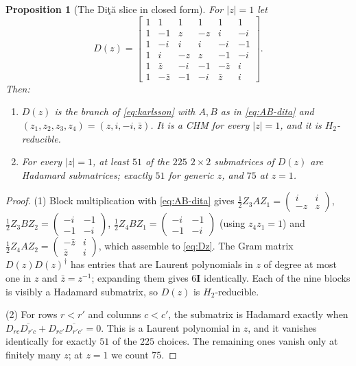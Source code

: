 \documentclass[11pt]{article}
\numberwithin{equation}{section}
\theoremstyle{plain}
\newtheorem{proposition}[theorem]{Proposition}
\theoremstyle{definition}
\theoremstyle{remark}
\newcommand{\I}{\mathbf{I}}
\newcommand{\dg}{^{\dagger}}
\newcommand{\Dita}{\texorpdfstring{Di\c{t}\u{a}}{Dita}}
\begin{document}
\begin{proposition}[The \Dita{} slice in closed form]\label{prop:slice}
For $|z|=1$ let
\begin{equation}\label{eq:Dz}
D(z)=
\begin{bmatrix}
1&1&1&1&1&1\\
1&-1&z&-z&i&-i\\
1&-i&i&i&-i&-1\\
1&i&-z&z&-1&-i\\
1&\bar z&-i&-1&-\bar z&i\\
1&-\bar z&-1&-i&\bar z&i
\end{bmatrix}.
\end{equation}
Then:
\begin{enumerate}
\item $D(z)$ is the branch of \eqref{eq:karlsson} with $A,B$ as in \eqref{eq:AB-dita} and $(z_1,z_2,z_3,z_4)=(z,i,-i,\bar z)$. It is a CHM for every $|z|=1$, and it is $H_2$-reducible.
\item For every $|z|=1$, at least $51$ of the $225$ $2\times2$ submatrices of $D(z)$ are Hadamard submatrices; exactly $51$ for generic $z$, and $75$ at $z=1$.
\end{enumerate}
\end{proposition}

\begin{proof}
(1) Block multiplication with \eqref{eq:AB-dita} gives $\tfrac12Z_3AZ_1=\begin{pmatrix}i&i\\-z&z\end{pmatrix}$, $\tfrac12Z_3BZ_2=\begin{pmatrix}-i&-1\\-1&-i\end{pmatrix}$, $\tfrac12Z_4BZ_1=\begin{pmatrix}-i&-1\\-1&-i\end{pmatrix}$ (using $z_4z_1=1$) and $\tfrac12Z_4AZ_2=\begin{pmatrix}-\bar z&i\\\bar z&i\end{pmatrix}$, which assemble to \eqref{eq:Dz}. The Gram matrix $D(z)D(z)\dg$ has entries that are Laurent polynomials in $z$ of degree at most one in $z$ and $\bar z=z^{-1}$; expanding them gives $6\I$ identically. Each of the nine blocks is visibly a Hadamard submatrix, so $D(z)$ is $H_2$-reducible.

(2) For rows $r<r'$ and columns $c<c'$, the submatrix is Hadamard exactly when $D_{rc}\overline{D_{r'c}}+D_{rc'}\overline{D_{r'c'}}=0$. This is a Laurent polynomial in $z$, and it vanishes identically for exactly $51$ of the $225$ choices. The remaining ones vanish only at finitely many $z$; at $z=1$ we count $75$.

\end{proof}
\end{document}
